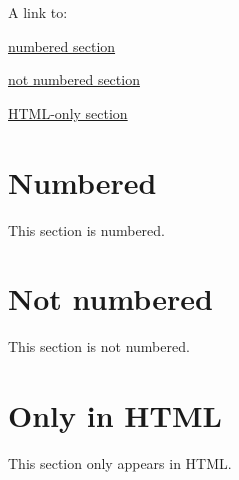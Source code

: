 \documentclass{article}
\begin{document}
A link to:

\hyperref[numbered]{numbered section}

\hyperref[not-numbered]{not numbered section}

\ifplastex
\hyperref[only-html]{HTML-only section}
\fi

\section{Numbered}\label{numbered}

This section is numbered.

\section*{Not numbered}\label{not-numbered}

This section is not numbered.

\ifplastex
\section*{Only in HTML}\label{only-html}

This section only appears in HTML.
\fi
\end{document}
